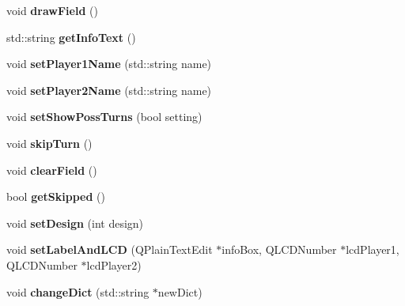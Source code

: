 \begin{DoxyCompactItemize}
\item 
\hypertarget{classcontrollerField_aeedbd443c54056d9a454642e62894cb6}{void {\bfseries draw\+Field} ()}\label{classcontrollerField_aeedbd443c54056d9a454642e62894cb6}

\item 
\hypertarget{classcontrollerField_a196e305ed159adbba60fffb3ab4cfe1d}{std\+::string {\bfseries get\+Info\+Text} ()}\label{classcontrollerField_a196e305ed159adbba60fffb3ab4cfe1d}

\item 
\hypertarget{classcontrollerField_ad0ae5854469851891bc7192f1e7b9632}{void {\bfseries set\+Player1\+Name} (std\+::string name)}\label{classcontrollerField_ad0ae5854469851891bc7192f1e7b9632}

\item 
\hypertarget{classcontrollerField_a214b3fa2ecc1d4317ba125f7ffbe2933}{void {\bfseries set\+Player2\+Name} (std\+::string name)}\label{classcontrollerField_a214b3fa2ecc1d4317ba125f7ffbe2933}

\item 
\hypertarget{classcontrollerField_a6f6b56018fb2bbe952e5469048fb9e91}{void {\bfseries set\+Show\+Poss\+Turns} (bool setting)}\label{classcontrollerField_a6f6b56018fb2bbe952e5469048fb9e91}

\item 
\hypertarget{classcontrollerField_ab219d3613ec10044b3c9942f46344e6a}{void {\bfseries skip\+Turn} ()}\label{classcontrollerField_ab219d3613ec10044b3c9942f46344e6a}

\item 
\hypertarget{classcontrollerField_adf62e7d928d2c623637f01a213668bda}{void {\bfseries clear\+Field} ()}\label{classcontrollerField_adf62e7d928d2c623637f01a213668bda}

\item 
\hypertarget{classcontrollerField_a467d0f68788bc1974a353fbf943296e6}{bool {\bfseries get\+Skipped} ()}\label{classcontrollerField_a467d0f68788bc1974a353fbf943296e6}

\item 
\hypertarget{classcontrollerField_ace8f9a7ae53975333a1d9a96323a0cf4}{void {\bfseries set\+Design} (int design)}\label{classcontrollerField_ace8f9a7ae53975333a1d9a96323a0cf4}

\item 
\hypertarget{classcontrollerField_aa1fc18d5aff7c23848249c3ee388a7b5}{void {\bfseries set\+Label\+And\+L\+C\+D} (Q\+Plain\+Text\+Edit $\ast$info\+Box, Q\+L\+C\+D\+Number $\ast$lcd\+Player1, Q\+L\+C\+D\+Number $\ast$lcd\+Player2)}\label{classcontrollerField_aa1fc18d5aff7c23848249c3ee388a7b5}

\item 
\hypertarget{classcontrollerField_a20710dbbb53f736e1d9baf00fc77cca4}{void {\bfseries change\+Dict} (std\+::string $\ast$new\+Dict)}\label{classcontrollerField_a20710dbbb53f736e1d9baf00fc77cca4}

\end{DoxyCompactItemize}
